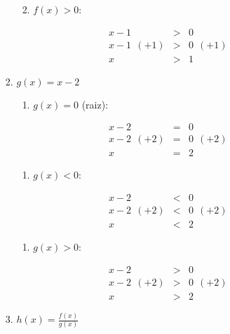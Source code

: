 \documentclass[]{book}
\providecommand{\tightlist}{%
  \setlength{\itemsep}{0pt}\setlength{\parskip}{0pt}}
\begin{document}
\begin{enumerate}
\begin{enumerate}
\begin{enumerate}
      \begin{enumerate}
      \def\labelenumiv{\Roman{enumiv})}
      \setcounter{enumiv}{2}
      \tightlist
      \item
        \(f(x) > 0\):
      \end{enumerate}

      \begin{eqnarray}
      x-1 &>& 0 \nonumber \\
      x-1 \ \ (+1) &>& 0 \ \ (+1) \nonumber \\
      x &>& 1 \nonumber
      \end{eqnarray}
    \item
      \(g(x) = x-2\)

      \begin{enumerate}
      \def\labelenumiv{\Roman{enumiv})}
      \tightlist
      \item
        \(g(x) = 0\) (raiz):
      \end{enumerate}

      \begin{eqnarray}
      x-2 &=& 0 \nonumber \\
      x-2 \ \ (+2) &=& 0 \ \ (+2) \nonumber \\
      x &=& 2 \nonumber
      \end{eqnarray}

      \begin{enumerate}
      \def\labelenumiv{\Roman{enumiv})}
      \setcounter{enumiv}{1}
      \tightlist
      \item
        \(g(x) < 0\):
      \end{enumerate}

      \begin{eqnarray}
      x-2 &<& 0 \nonumber \\
      x-2 \ \ (+2) &<& 0 \ \ (+2) \nonumber \\
      x &<& 2 \nonumber
      \end{eqnarray}

      \begin{enumerate}
      \def\labelenumiv{\Roman{enumiv})}
      \setcounter{enumiv}{2}
      \tightlist
      \item
        \(g(x) > 0\):
      \end{enumerate}

      \begin{eqnarray}
      x-2 &>& 0 \nonumber \\
      x-2 \ \ (+2) &>& 0 \ \ (+2) \nonumber \\
      x &>& 2 \nonumber
      \end{eqnarray}
    \item
      \(h(x) = \frac{f(x)}{g(x)}\)
    \end{enumerate}


\end{enumerate}
\end{enumerate}
\end{document}
